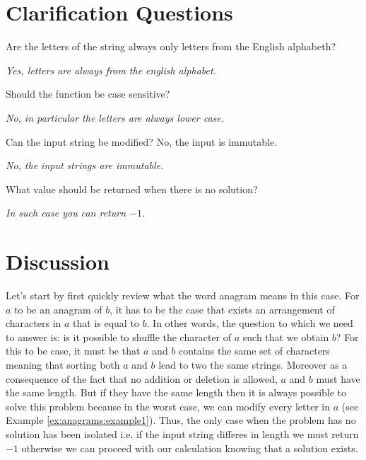 \section{Clarification Questions}

\begin{QandA}
	\item Are the letters of the string always only letters from the English alphabeth? 
	\begin{answered}
		\textit{Yes, letters are always from the english alphabet.}
	\end{answered}
	
	\item Should the function be case sensitive? 
	\begin{answered}
		\textit{No, in particular the letters are always lower case.}
	\end{answered}
	\item Can the input string be modified? No, the input is immutable.
	\begin{answered}
		\textit{No, the input strings are immutable.}
	\end{answered}

	\item What value should be returned when there is no solution?
	\begin{answered}
		\textit{In such case you can return $-1$.}
	\end{answered}
\end{QandA}

\section{Discussion}
Let's start by first quickly review what the word anagram means in this case. For $a$ to be an anagram
of $b$, it has to be the case that exists an arrangement of characters in $a$ that is equal to $b$.
In other words, the question to which we need to answer is: is it possible to shuffle the character of $a$ such that we obtain $b$?
For this to be case, it must be that $a$ and $b$ contains the same set of characters meaning that sorting both $a$ and $b$
lead to two the same strings. 
Moreover as a consequence of the fact that no addition or deletion
is allowed, $a$ and $b$ must have the same length. 
But if they have the same length then it is always
possible to solve this problem because in the worst case, we can modify every letter in $a$ (see Example \ref{ex:anagrams:example1}).
Thus, the only case when the problem has no solution has been isolated i.e. if the input string differes in length we must return $-1$ otherwise we can proceed with our calculation knowing that a solution exists.


